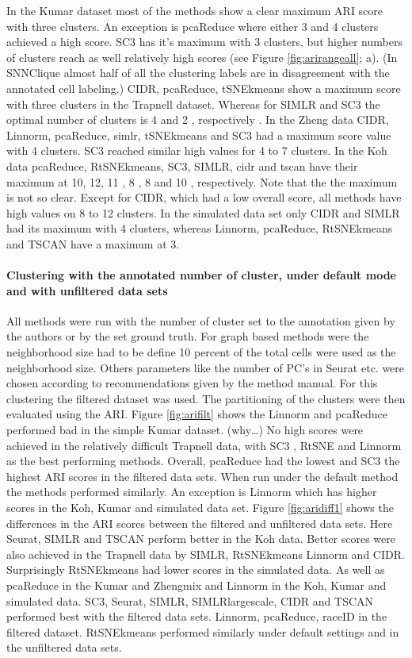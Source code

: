 \documentclass[11pt, a4paper]{article}\usepackage[]{graphicx}\usepackage[]{color}
\begin{document}
In the Kumar dataset most of the methods show a clear maximum ARI score with three clusters. An exception is pcaReduce where either 3 and 4 clusters achieved a high score. SC3 has it’s maximum with 3 clusters, but higher numbers of clusters reach as well relatively high scores (see Figure \ref{fig:arirangeall}; a). (In SNNClique almost half of all the clustering labels are in disagreement with the annotated cell labeling.)
CIDR, pcaReduce, tSNEkmeans show a maximum score with three clusters in the Trapnell dataset. Whereas for SIMLR and SC3 the optimal number of clusters is 4 and 2 , respectively . 
In the Zheng data CIDR, Linnorm, pcaReduce,  simlr, tSNEkmeans and SC3 had a maximum score value with 4 clusters.  SC3 reached  similar high values for 4 to 7 clusters. In the Koh data pcaReduce, RtSNEkmeans, SC3, SIMLR, cidr and tscan have their maximum at 10, 12, 11 , 8 , 8 and 10 , respectively. Note that the the maximum is not so clear. Except for CIDR, which had a low overall score, all methods have high values on 8 to 12 clusters. In the simulated data set only CIDR and SIMLR had its maximum with 4 clusters, whereas Linnorm, pcaReduce, RtSNEkmeans and TSCAN have a maximum at 3. 



\paragraph{Clustering with the annotated number of cluster, under default mode and with unfiltered data sets}
All methods were run with the number of cluster set to the annotation given by the authors or by the set ground truth. For graph based methods were the neighborhood size had to be define 10 percent of the total cells were used as the  neighborhood size. Others parameters like the number of PC's in Seurat etc. were chosen according to recommendations given by the method manual. For this clustering the filtered dataset was used. 
The partitioning of the clusters were then evaluated using the ARI. Figure \ref{fig:arifilt} shows the Linnorm and pcaReduce performed bad in the simple Kumar dataset.   (why…) No high scores were achieved  in the relatively difficult Trapnell data, with SC3  , RtSNE and Linnorm as the best performing methods. Overall, pcaReduce had the lowest and  SC3  the highest ARI scores  in the filtered data sets. When run under the default method the methods performed similarly. An exception is Linnorm which has higher scores in the Koh, Kumar and simulated data set.
Figure \ref{fig:aridiff1} shows the differences in the ARI scores between the filtered and unfiltered data sets. Here Seurat,  SIMLR and TSCAN perform better in the Koh data. Better scores were also achieved in the Trapnell data by SIMLR, RtSNEkmeans Linnorm and CIDR. Surprisingly RtSNEkmeans had lower scores in the simulated data. As well as pcaReduce in the Kumar and Zhengmix and Linnorm in the Koh, Kumar and simulated data. 
SC3, Seurat, SIMLR, SIMLRlargescale, CIDR and TSCAN performed best with the filtered data sets. Linnorm, pcaReduce, raceID in the filtered dataset. RtSNEkmeans performed similarly under default settings and in the unfiltered data sets.
\end{document}
